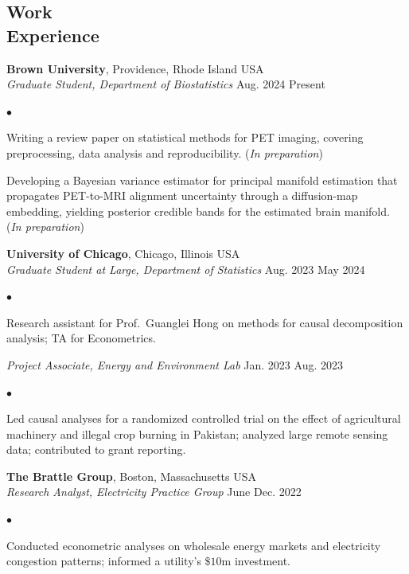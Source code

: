 \documentclass[margin,line]{res}
\newenvironment{bullets}{%
  \begin{list}{$\bullet$}{%
    \setlength{\itemsep}{0in}%
    \setlength{\parsep}{0in}%
    \setlength{\parskip}{0in}%
    \setlength{\topsep}{0in}%
    \setlength{\partopsep}{0in}%
    \setlength{\leftmargin}{0.15in}%
    \setlength{\labelsep}{0.05in}%
    \setlength{\labelwidth}{0.1in}}}%
  {\end{list}}
\begin{document}
\begin{resume}
\section{\sc Work \\ Experience}

\textbf{Brown University}, Providence, Rhode Island USA \\[1mm]
\textit{Graduate Student, Department of Biostatistics} \hfill Aug. 2024{ \textemdash } Present
\begin{bullets}
  \item[-] Writing a review paper on statistical methods for PET imaging, covering preprocessing, data analysis and reproducibility. (\emph{In preparation})
  \item[-] Developing a Bayesian variance estimator for principal manifold estimation that propagates PET-to-MRI alignment uncertainty through a diffusion-map embedding, yielding posterior credible bands for the estimated brain manifold. (\emph{In preparation})
\end{bullets}

\textbf{University of Chicago}, Chicago, Illinois USA \\[1mm]
\textit{Graduate Student at Large, Department of Statistics} \hfill Aug. 2023{ \textemdash } May 2024
\begin{bullets}
\item[-] Research assistant for Prof.\ Guanglei Hong on methods for causal decomposition analysis; TA for Econometrics.
\end{bullets}
\vspace{-\parskip}\vspace{1mm} %
\textit{Project Associate, Energy and Environment Lab} \hfill Jan. 2023{ \textemdash } Aug. 2023
\begin{bullets}
\item[-] Led causal analyses for a randomized controlled trial on the effect of agricultural machinery and illegal crop burning in Pakistan; analyzed large remote sensing data; contributed to grant reporting.
\end{bullets}

\textbf{The Brattle Group}, Boston, Massachusetts USA\\[1mm]
\textit{Research Analyst, Electricity Practice Group} \hfill June{ \textemdash } Dec. 2022
\begin{bullets}
\item[-] Conducted econometric analyses on wholesale energy markets and electricity congestion patterns; informed a utility's $\$10$m investment.
\end{bullets}


\end{resume}
\end{document}
